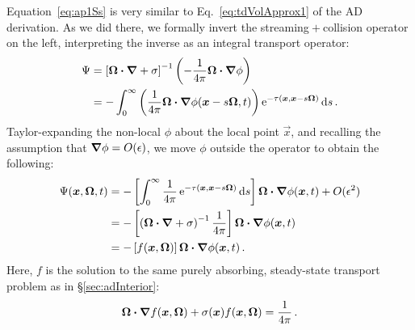 Equation~\eqref{eq:ap1Ss} is very similar to Eq.~\eqref{eq:tdVolApprox1} of the
AD derivation. As we did there, we formally invert the streaming${}+{}$collision
operator on the left, interpreting the inverse as an integral transport
operator:
\begin{align*}
  \Psi
  &= \left[ \bm{\Omega}\bm{\cdot} \bm{\nabla} + \sigma \right]^{-1} \left(
  - \frac{1}{4\pi} \bm{\Omega}\bm{\cdot} \bm{\nabla} \phi \right)
  \\
  &= - \int_{0}^{\infty}
  \left( \frac{1}{4\pi} \bm{\Omega}\bm{\cdot} \bm{\nabla} \phi(\bm{x} - s \bm{\Omega},
  t)\right)
  \mathop{}\!\mathrm{e}^{ -\tau(\bm{x}, \bm{x} - s \bm{\Omega})}
  \mathop{}\!\mathrm{d} s \,.
\end{align*}
Taylor-expanding the non-local $\phi$ about the local point $\vec{x}$, and
recalling the assumption that $\bm{\nabla}\phi = O(\epsilon)$, we move $\phi$ outside
the operator to obtain the following:
\begin{align} \nonumber
\Psi(\bm{x},\bm{\Omega},t)
&= - \left[ \int_{0}^{\infty} \frac{1}{4\pi} 
    \mathop{}\!\mathrm{e}^{ -\tau(\bm{x}, \bm{x} - s \bm{\Omega})}
      \mathop{}\!\mathrm{d} s \right] \bm{\Omega}\bm{\cdot} \bm{\nabla}\phi(\bm{x}, t) + O(\epsilon^2)
\\ \nonumber
&= - 
  \left[\left(\bm{\Omega}\bm{\cdot} \bm{\nabla}  + \sigma \right)^{-1}
  \frac{1}{4\pi}\right] \bm{\Omega}\bm{\cdot} \bm{\nabla} \phi(\bm{x}, t)
\\ \label{eq:ap1capPsiApprox}
&= - \left[ f(\bm{x},\bm{\Omega}) \right] \bm{\Omega}\bm{\cdot} \bm{\nabla} \phi(\bm{x}, t)\,.
\end{align}
Here, $f$ is the solution to the same purely absorbing, steady-state transport
problem as in \S\ref{sec:adInterior}:
\begin{equation} \label{eq:fFullVol_4}
  \bm{\Omega}\bm{\cdot} \bm{\nabla} f(\bm{x}, \bm{\Omega})
  + \sigma(\bm{x}) f (\bm{x}, \bm{\Omega})
= \frac{1}{4\pi} \,.
\end{equation}

